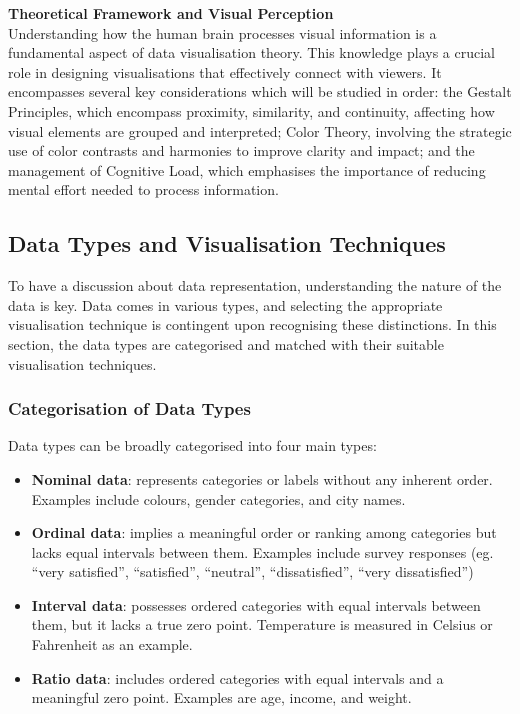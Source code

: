 \documentclass{article}\usepackage[]{graphicx}\usepackage[]{xcolor}
\begin{document}
\noindent \textbf{Theoretical Framework and Visual Perception}\\
Understanding how the human brain processes visual information is a fundamental aspect of data visualisation theory. This knowledge plays a crucial role in designing visualisations that effectively connect with viewers. It encompasses several key considerations which will be studied in order: the Gestalt Principles, which encompass proximity, similarity, and continuity, affecting how visual elements are grouped and interpreted; Color Theory, involving the strategic use of color contrasts and harmonies to improve clarity and impact; and the management of Cognitive Load, which emphasises the importance of reducing mental effort needed to process information.

\subsection{Data Types and Visualisation Techniques}
To have a discussion about data representation, understanding the nature of the data is key. Data comes in various types, and selecting the appropriate visualisation technique is contingent upon recognising these distinctions. In this section, the data types are categorised and matched with their suitable visualisation techniques.

\subsubsection{Categorisation of Data Types}
Data types can be broadly categorised into four main types: 
\begin{itemize}
    \item \textbf{Nominal data}: represents categories or labels without any inherent order. Examples include colours, gender categories, and city names. 
    \item \textbf{Ordinal data}: implies a meaningful order or ranking among categories but lacks equal intervals between them. Examples include survey responses (eg. “very satisfied”, “satisfied”, “neutral”, “dissatisfied”, “very dissatisfied”)
    \item \textbf{Interval data}: possesses ordered categories with equal intervals between them, but it lacks a true zero point. Temperature is measured in Celsius or Fahrenheit as an example. 
    \item \textbf{Ratio data}: includes ordered categories with equal intervals and a meaningful zero point. Examples are age, income, and weight. 
\end{itemize}
\end{document}
